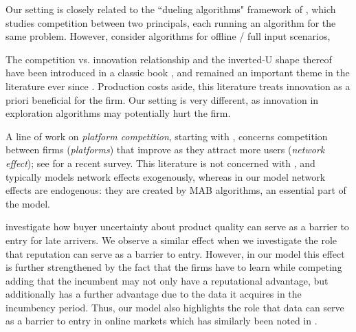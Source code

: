Our setting is closely related to the ``dueling algorithms" framework of \citet{DuelingAlgs-stoc11}, which studies competition between two principals, each running an algorithm for the same problem. However, \citet{DuelingAlgs-stoc11} consider algorithms for offline / full input scenarios, 

 The competition vs. innovation relationship and the inverted-U shape thereof have been introduced in a classic book \citep{Schumpeter-42}, and remained an important theme in the literature ever since \cite[\eg][]{Aghion-QJE05,Vives-08}. Production costs aside, this literature treats innovation as a priori beneficial for the firm. Our setting is very different, as innovation in exploration algorithms may potentially hurt the firm.


A line of work on \emph{platform competition}, starting with \cite{Rysman09}, concerns competition between firms (\emph{platforms}) that improve as they attract more users (\emph{network effect}); see \citet{Weyl-White-14} for a recent survey. This literature is not concerned with \innovation, and typically models network effects exogenously, whereas in our model network effects are endogenous: they are created by MAB algorithms, an essential part of the model.

\cite{schmalensee1982product, bagwell1990informational} investigate how buyer uncertainty about product quality can serve as a barrier to entry for late arrivers. We observe a similar effect when we investigate the role that reputation can serve as a barrier to entry. However, in our model this effect is further strengthened by the fact that the firms have to learn while competing adding that the incumbent may not only have a reputational advantage, but additionally has a further advantage due to the data it acquires in the incumbency period. Thus, our model also highlights the role that data can serve as a barrier to entry in online markets which has similarly been noted in \cite{de2020data}. 


